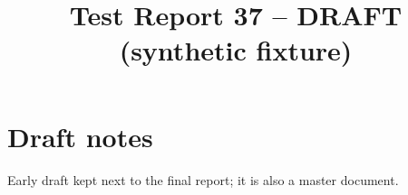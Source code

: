 \documentclass{article}
\title{Test Report 37 -- DRAFT (synthetic fixture)}
\begin{document}
\maketitle
\section{Draft notes}
Early draft kept next to the final report; it is also a master document.
\end{document}
